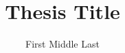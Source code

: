 \documentclass[
	pdfa,
	oneside,
	chapterbib,
	saychapapp,
	simpleheaders,
	colourlinks]{ualberta}
\title{Thesis Title}                         %
\author{First Middle Last}                   %
\begin{document}
	\maketitle                   %
	\makeabstract                %
	\makepreface                 %
	\makededicationandquote      %
	\makeacknowledgements        %

	\onehalfspacing              %

	\tableofcontents             %
	\listoftables                %
	\listoffigures               %
	\listofplates                %
	\listofillustrations         %
	\listofvideos                %
	\listofsounds                %
	\listofphotos                %
	\listofsymbols               %
	\abbreviations               %
	\glsaddall                   %
	\generateglossary            %


	\bodyoftext %

	\doublespacing         %

%
% 
\end{document}
